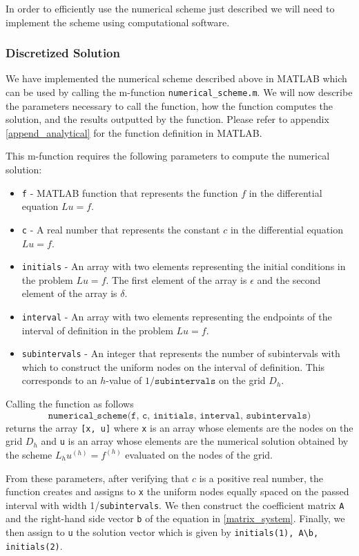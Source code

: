 In order to efficiently use the numerical scheme just described we will need to
implement the scheme using computational software.

\subsubsection{Discretized Solution}
We have implemented the numerical scheme described above in MATLAB which can be
used by calling the m-function \texttt{numerical\_scheme.m}. We will now
describe the parameters necessary to call the function, how the function
computes the solution, and the results outputted by the function. Please refer
to appendix \ref{append_analytical} for the function definition in MATLAB.

This m-function requires the following parameters to compute the numerical solution:
\begin{itemize}
  \item \texttt{f} - MATLAB function that represents the function $f$ in the differential equation $Lu = f$.
  \item \texttt{c} - A real number that represents the constant $c$ in the differential equation $Lu = f$.
  \item \texttt{initials} - An array with two elements representing the initial conditions in the problem
    $Lu=f$. The first element of the array is $\epsilon$ and the second element of the array is $\delta$.
  \item \texttt{interval} - An array with two elements representing the endpoints of the interval of definition in
    the problem $Lu = f$.
  \item \texttt{subintervals} - An integer that represents the number of subintervals with which to construct
    the uniform nodes on the interval of definition. This corresponds to an
    $h$-value of $1/\texttt{subintervals}$ on the grid $D_h$.
\end{itemize}

Calling the function as follows
\[
  \texttt{numerical\_scheme(f, c, initials, interval, subintervals)}
\]
returns the array \texttt{[x, u]} where \texttt{x} is an array whose elements are
the nodes on the grid $D_h$ and \texttt{u} is an array whose elements are the
numerical solution obtained by the scheme $L_h u^{(h)} = f^{(h)}$ evaluated on the
nodes of the grid.

From these parameters, after verifying that $c$ is a positive real number,
the function creates and assigns to \texttt{x} the uniform
nodes equally spaced on the passed interval with width 1/\texttt{subintervals}. We then
construct the  coefficient matrix \texttt{A} and the right-hand side vector \texttt{b} of the equation
in \eqref{matrix_system}. Finally, we then assign to \texttt{u} the solution vector
which is given by \texttt{initials(1), A\textbackslash b, initials(2)}.

